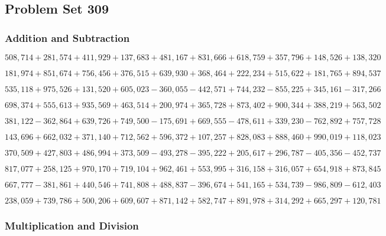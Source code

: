 \hypertarget{problem-set-309}{%
\subsection{Problem Set 309}\label{problem-set-309}}

\hypertarget{addition-and-subtraction}{%
\subsubsection{Addition and
Subtraction}\label{addition-and-subtraction}}

\(508,714+281,574+411,929+137,683+481,167+831,666+618,759+357,796+148,526+138,320\)

\(181,974+851,674+756,456+376,515+639,930+368,464+222,234+515,622+181,765+894,537\)

\(535,118+975,526+131,520+605,023-360,055-442,571+744,232-855,225+345,161-317,266\)

\(698,374+555,613+935,569+463,514+200,974+365,728+873,402+900,344+388,219+563,502\)

\(381,122-362,864+639,726+749,500-175,691+669,555-478,611+339,230-762,892+757,728\)

\(143,696+662,032+371,140+712,562+596,372+107,257+828,083+888,460+990,019+118,023\)

\(370,509+427,803+486,994+373,509-493,278-395,222+205,617+296,787-405,356-452,737\)

\(817,077+258,125+970,170+719,104+962,461+553,995+316,158+316,057+654,918+873,845\)

\(667,777-381,861+440,546+741,808+488,837-396,674+541,165+534,739-986,809-612,403\)

\(238,059+739,786+500,206+609,607+871,142+582,747+891,978+314,292+665,297+120,781\)

\hypertarget{multiplication-and-division}{%
\subsubsection{Multiplication and
Division}\label{multiplication-and-division}}

